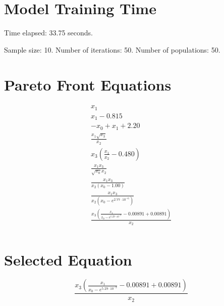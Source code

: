 \documentclass{article}
\begin{document}
\section*{Model Training Time}
Time elapsed: 33.75 seconds.

Sample size: 10.
Number of iterations: 50.
Number of populations: 50.

\section*{Pareto Front Equations}
\begin{align*}
x_{1} \\
x_{1} - 0.815 \\
- x_{0} + x_{1} + 2.20 \\
\frac{x_{1} \sqrt{x_{3}}}{x_{2}} \\
x_{3} \left(\frac{x_{1}}{x_{2}} - 0.480\right) \\
\frac{x_{1} x_{3}}{\sqrt{x_{0}} x_{2}} \\
\frac{x_{1} x_{3}}{x_{2} \left(x_{0} - 1.00\right)} \\
\frac{x_{1} x_{3}}{x_{2} \left(x_{0} - e^{2.77 \cdot 10^{-6}}\right)} \\
\frac{x_{3} \left(\frac{x_{1}}{x_{0} - e^{5.29 \cdot 10^{-9}}} - 0.00891 + 0.00891\right)}{x_{2}} \\
\end{align*}

\section*{Selected Equation}
\[ \frac{x_{3} \left(\frac{x_{1}}{x_{0} - e^{5.29 \cdot 10^{-9}}} - 0.00891 + 0.00891\right)}{x_{2}} \]
\end{document}

